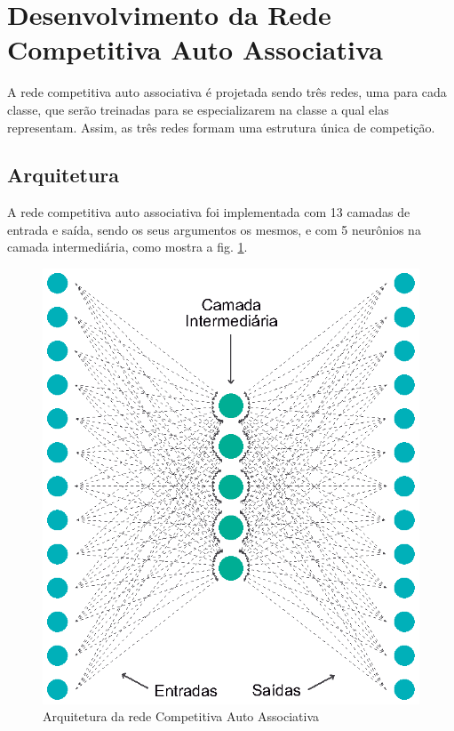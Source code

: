 
\section{Desenvolvimento da Rede Competitiva Auto Associativa} \label{desenvolvimentoAuto}

A rede competitiva auto associativa é projetada sendo três redes, uma para cada classe, que serão treinadas para se especializarem na classe a qual elas representam. Assim, as três redes formam uma estrutura única de competição.


\subsection{Arquitetura}

A rede competitiva auto associativa foi implementada com 13 camadas de entrada e saída, sendo os seus argumentos os mesmos, e com 5 neurônios na camada intermediária, como mostra a fig. \ref{figura:arquiteturaAuto}.

\begin{figure}[H]

\centering %
\includegraphics{04-Figuras/Arquitetura-AutoAssociativa}

\caption{Arquitetura da rede Competitiva Auto Associativa}

\label{figura:arquiteturaAuto}

\end{figure}